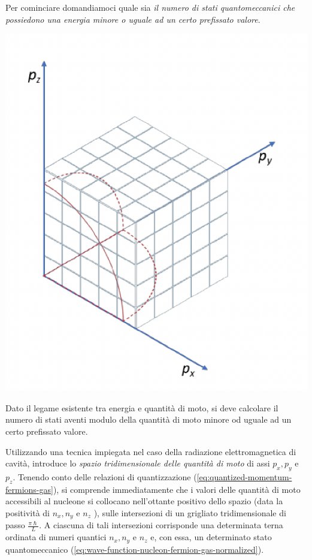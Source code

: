 Per cominciare domandiamoci quale sia \emph{il numero di stati quantomeccanici che possiedono una energia minore o uguale ad un certo prefissato valore}.
\begin{marginfigure}
	\includegraphics{figs/cube-fermion-gas2}
\end{marginfigure}
Dato il legame esistente tra energia e quantità di moto, si deve calcolare il numero di stati aventi modulo della quantità di moto minore od uguale ad un certo prefissato valore.

Utilizzando una tecnica impiegata nel caso della radiazione elettromagnetica di cavità, introduce lo \emph{spazio tridimensionale delle quantità di moto} di assi $p_{x}, p_{y}$ e $p_{z}$. Tenendo conto delle relazioni di quantizzazione (\ref{eq:quantized-momentum-fermions-gas}), si comprende immediatamente che i valori delle quantità di moto accessibili al nucleone si collocano nell’ottante positivo dello spazio (data la positività di $n_{x}, n_{y}$ e $n_{z}$ ), sulle intersezioni di un grigliato tridimensionale di passo $\frac{\pi \hslash}{L}$.
A ciascuna di tali intersezioni corrisponde una determinata terna ordinata di numeri quantici $n_{x}, n_{y}$ e $n_{z}$ e, con essa, un determinato stato quantomeccanico (\ref{eq:wave-function-nucleon-fermion-gas-normalized}).


